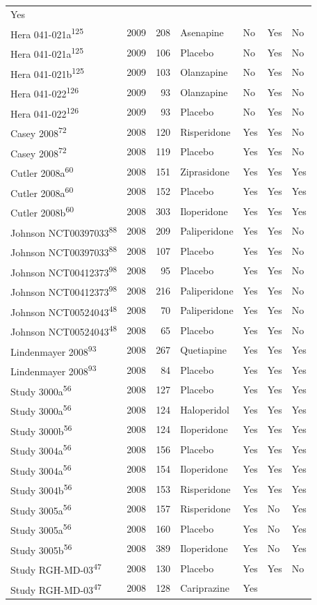 \documentclass[9pt,english,,jou,floatsintext]{apa6}
\begin{document}
\begin{longtable}[]{@{}lrrllll@{}}
Yes\tabularnewline
Hera 041-021a\textsuperscript{125} & 2009 & 208 & Asenapine & No & Yes &
No\tabularnewline
Hera 041-021a\textsuperscript{125} & 2009 & 106 & Placebo & No & Yes &
No\tabularnewline
Hera 041-021b\textsuperscript{125} & 2009 & 103 & Olanzapine & No & Yes
& No\tabularnewline
Hera 041-022\textsuperscript{126} & 2009 & 93 & Olanzapine & No & Yes &
No\tabularnewline
Hera 041-022\textsuperscript{126} & 2009 & 93 & Placebo & No & Yes &
No\tabularnewline
Casey 2008\textsuperscript{72} & 2008 & 120 & Risperidone & Yes & Yes &
No\tabularnewline
Casey 2008\textsuperscript{72} & 2008 & 119 & Placebo & Yes & Yes &
No\tabularnewline
Cutler 2008a\textsuperscript{60} & 2008 & 151 & Ziprasidone & Yes & Yes
& Yes\tabularnewline
Cutler 2008a\textsuperscript{60} & 2008 & 152 & Placebo & Yes & Yes &
Yes\tabularnewline
Cutler 2008b\textsuperscript{60} & 2008 & 303 & Iloperidone & Yes & Yes
& Yes\tabularnewline
Johnson NCT00397033\textsuperscript{88} & 2008 & 209 & Paliperidone &
Yes & Yes & No\tabularnewline
Johnson NCT00397033\textsuperscript{88} & 2008 & 107 & Placebo & Yes &
Yes & No\tabularnewline
Johnson NCT00412373\textsuperscript{98} & 2008 & 95 & Placebo & Yes &
Yes & No\tabularnewline
Johnson NCT00412373\textsuperscript{98} & 2008 & 216 & Paliperidone &
Yes & Yes & No\tabularnewline
Johnson NCT00524043\textsuperscript{48} & 2008 & 70 & Paliperidone & Yes
& Yes & No\tabularnewline
Johnson NCT00524043\textsuperscript{48} & 2008 & 65 & Placebo & Yes &
Yes & No\tabularnewline
Lindenmayer 2008\textsuperscript{93} & 2008 & 267 & Quetiapine & Yes &
Yes & Yes\tabularnewline
Lindenmayer 2008\textsuperscript{93} & 2008 & 84 & Placebo & Yes & Yes &
Yes\tabularnewline
Study 3000a\textsuperscript{56} & 2008 & 127 & Placebo & Yes & Yes &
Yes\tabularnewline
Study 3000a\textsuperscript{56} & 2008 & 124 & Haloperidol & Yes & Yes &
Yes\tabularnewline
Study 3000b\textsuperscript{56} & 2008 & 124 & Iloperidone & Yes & Yes &
Yes\tabularnewline
Study 3004a\textsuperscript{56} & 2008 & 156 & Placebo & Yes & Yes &
Yes\tabularnewline
Study 3004a\textsuperscript{56} & 2008 & 154 & Iloperidone & Yes & Yes &
Yes\tabularnewline
Study 3004b\textsuperscript{56} & 2008 & 153 & Risperidone & Yes & Yes &
Yes\tabularnewline
Study 3005a\textsuperscript{56} & 2008 & 157 & Risperidone & Yes & No &
Yes\tabularnewline
Study 3005a\textsuperscript{56} & 2008 & 160 & Placebo & Yes & No &
Yes\tabularnewline
Study 3005b\textsuperscript{56} & 2008 & 389 & Iloperidone & Yes & No &
Yes\tabularnewline
Study RGH-MD-03\textsuperscript{47} & 2008 & 130 & Placebo & Yes & Yes &
No\tabularnewline
Study RGH-MD-03\textsuperscript{47} & 2008 & 128 & Cariprazine & Yes &

\end{longtable}
\end{document}

